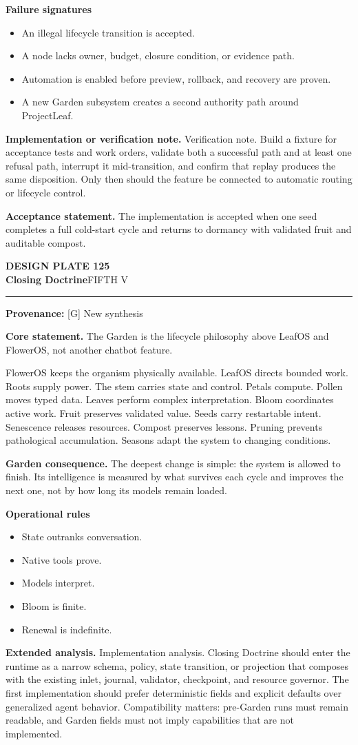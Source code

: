\documentclass[10pt,letterpaper,oneside]{article}
\newcommand{\prov}[1]{\textcolor{gardenBlue}{\sffamily\footnotesize\textbf{Provenance:} #1}}
\newcommand{\platetitle}[3]{%
  \begin{minipage}[t][0.54in][t]{\textwidth}
  {\sffamily\bfseries\color{gardenDeep}\fontsize{9}{10}\selectfont DESIGN PLATE #1}\\[-1pt]
  {\sffamily\bfseries\color{gardenInk}\fontsize{16.5}{18}\selectfont #2}\hfill{\sffamily\color{gardenGreen}\large #3}
  \end{minipage}\vspace{-2pt}\hrule\vspace{5pt}}
\begin{document}
\textbf{Failure signatures}
\begin{itemize}
\item An illegal lifecycle transition is accepted.
\item A node lacks owner, budget, closure condition, or evidence path.
\item Automation is enabled before preview, rollback, and recovery are proven.
\item A new Garden subsystem creates a second authority path around ProjectLeaf.
\end{itemize}
\textbf{Implementation or verification note.} Verification note. Build a fixture for acceptance tests and work orders, validate both a successful path and at least one refusal path, interrupt it mid-transition, and confirm that replay produces the same disposition. Only then should the feature be connected to automatic routing or lifecycle control.

\begin{acceptbox}
\textbf{Acceptance statement.} The implementation is accepted when one seed completes a full cold-start cycle and returns to dormancy with validated fruit and auditable compost.
\end{acceptbox}
\newpage
\platetitle{125}{Closing Doctrine}{FIFTH V}
\prov{[G] New synthesis}
\fontsize{8.85}{10.45}\selectfont
\begin{corebox}
\textbf{Core statement.} The Garden is the lifecycle philosophy above LeafOS and FlowerOS, not another chatbot feature.
\end{corebox}
FlowerOS keeps the organism physically available. LeafOS directs bounded work. Roots supply power. The stem carries state and control. Petals compute. Pollen moves typed data. Leaves perform complex interpretation. Bloom coordinates active work. Fruit preserves validated value. Seeds carry restartable intent. Senescence releases resources. Compost preserves lessons. Pruning prevents pathological accumulation. Seasons adapt the system to changing conditions.

\textbf{Garden consequence.} The deepest change is simple: the system is allowed to finish. Its intelligence is measured by what survives each cycle and improves the next one, not by how long its models remain loaded.

\textbf{Operational rules}
\begin{itemize}
\item State outranks conversation.
\item Native tools prove.
\item Models interpret.
\item Bloom is finite.
\item Renewal is indefinite.
\end{itemize}
\textbf{Extended analysis.} Implementation analysis. Closing Doctrine should enter the runtime as a narrow schema, policy, state transition, or projection that composes with the existing inlet, journal, validator, checkpoint, and resource governor. The first implementation should prefer deterministic fields and explicit defaults over generalized agent behavior. Compatibility matters: pre-Garden runs must remain readable, and Garden fields must not imply capabilities that are not implemented.
\end{document}
